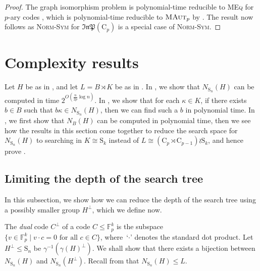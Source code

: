 \documentclass[11pt,a4paper]{article}
\theoremstyle{definition}
\theoremstyle{remark}
\newcommand{\InP}{\mathfrak{InP}}
\newcommand{\Sy}{\mathrm{S}}
\newcommand{\Cy}{\mathrm{C}}
\begin{document}
\begin{proof}
The graph isomorphism problem is polynomial-time reducible to \textsc{MEq} for $p$-ary codes \cite{codeEquivGI}, which is polynomial-time reducible to $\textsc{MAut}_p$ by . The result now follows as \textsc{Norm-Sym} for $\InP(\Cy_p)$ is a special case of \textsc{Norm-Sym}. 
\end{proof}


\section{Complexity results}
\label{section: reduce tree}

Let $H$ be as in , and let $L= B \rtimes K$ be as in . 
In , we show that $N_{\Sy_n}(H)$ can be computed in time $2^{O(\frac{n}{2p} \log{n} )}$. 
In , we show that for each $\kappa \in K$, if there exists $b \in B$ such that $b \kappa \in N_{\Sy_n}(H)$, then we can find such a $b$ in polynomial time. 
In , we first show that $N_{B}(H)$ can be computed in polynomial time, then we see how the results in this section come together to reduce the search space for $N_{\Sy_n}(H)$ to searching in $K \cong \Sy_k$ instead of $L \cong (\Cy_p \rtimes \Cy_{p-1}) \wr \Sy_k$, and hence prove .

\subsection{Limiting the depth of the search tree}
\label{subsection: limit depth}\label{defn: dual code}

In this subsection, we show how we can reduce the depth of the search tree using a possibly smaller group $H^{\bot}$, which we define now. 

The \emph{dual} code $C^{\bot}$ of a code $C\leq \mathds{F}_p^k$ is the subspace $\{ v \in \mathds{F}_p^k \mid  v \cdot c = 0 \text{ for all } c \in C \}$, where~`$\cdot$' denotes the standard dot product. 
Let $H^{\bot} \leq \Sy_n$ be $\gamma^{-1}(\gamma(H)^{\bot})$.
We shall show that there exists a bijection between $N_{\Sy_n}(H)$ and $N_{\Sy_n}(H^{\bot})$.
Recall from  that $N_{\Sy_n}(H) \leq L$.
\end{document}
